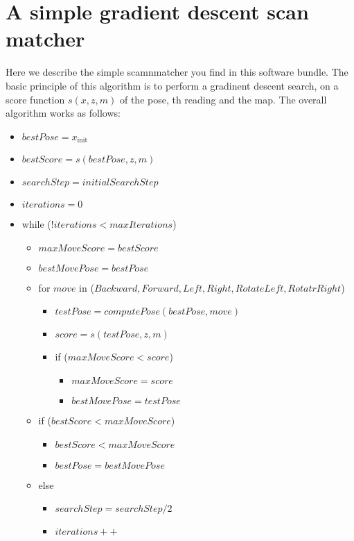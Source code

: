 \documentclass[a4paper]{article}
\begin{document}
\section{A simple gradient descent scan matcher}
Here we describe the simple scamnmatcher you find in this software bundle.
The basic principle of this algorithm is to perform a gradinent descent search,
on a score function $s(x,z,m)$ of the pose, th reading and the map.
The overall algorithm works as follows:
\begin{itemize}
\item $bestPose=x_\mathrm{init}$
\item $bestScore=s(bestPose,z,m)$
\item $searchStep=initialSearchStep$
\item $iterations=0$
\item while (!$iterations<maxIterations$)
	\begin{itemize}
	\item $maxMoveScore=bestScore$
	\item $bestMovePose=bestPose$
	\item for $move$ in ($Backward, Forward, Left, Right, RotateLeft, RotatrRight$)
		\begin{itemize}
		\item  $testPose=computePose(bestPose, move)$
		\item  $score=s(testPose,z,m)$
		\item if ($maxMoveScore<score$)
			\begin{itemize}
			\item $maxMoveScore=score$
			\item $bestMovePose=testPose$
			\end{itemize}
		\end{itemize}
	\item if ($bestScore<maxMoveScore$)
		\begin{itemize}
		\item $bestScore<maxMoveScore$
		\item $bestPose=bestMovePose$
		\end{itemize}
	\item else 
		\begin{itemize}
		\item $searchStep=searchStep/2$
		\item $iterations++$
		\end{itemize}
	\end{itemize}
\end{itemize}
\end{document}
